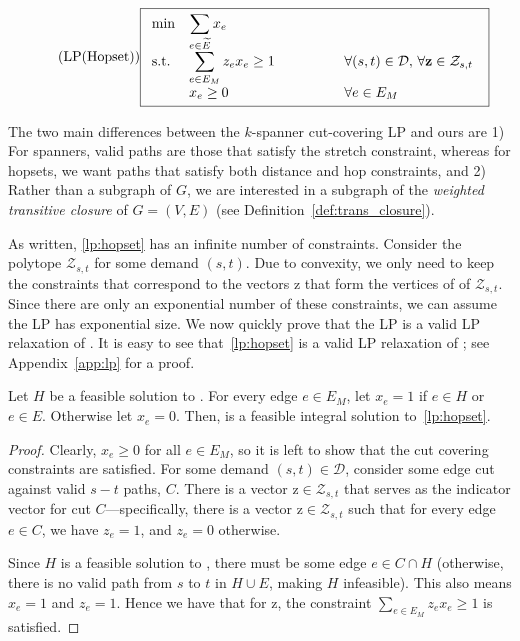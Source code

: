 \begin{equation} \label{lp:hopset} \tag{LP(Hopset)}
\fbox{$
\begin{array}{lll}
\min & \displaystyle \sum_{e \in \widetilde{E} } x_e \\
\mathrm{s.t.} & \displaystyle \sum_{e \in E_M} z_e x_e \geq 1 \qquad \qquad & \forall (s,t) \in \mathcal{D}, \, \forall \bm{\mathrm{z}} \in \mathcal{Z}_{s,t} \\
& \displaystyle x_e \geq 0 & \forall e \in E_M \\
\end{array}
$
}
\end{equation}

The two main differences between the $k$-spanner cut-covering LP and ours are 1) For spanners, valid paths are those that satisfy the stretch constraint, whereas for hopsets, we want paths that satisfy both distance and hop constraints, and 2) Rather than a subgraph of $G$, we are interested in a subgraph of the \textit{weighted transitive closure} of $G = (V,E)$ (see Definition~\ref{def:trans_closure}). 

As written, \ref{lp:hopset} has an infinite number of constraints. Consider the polytope $\mathcal{Z}_{s,t}$ for some demand $(s,t)$. Due to convexity, we only need to keep the constraints that correspond to the vectors $\bm{\mathrm{z}}$ that form the vertices of of $\mathcal{Z}_{s,t}$. Since there are only an exponential number of these constraints, we can assume the LP has exponential size. \iflong We now quickly prove that the LP is a valid LP relaxation of {\hopset}. \else It is easy to see that~\ref{lp:hopset} is a valid LP relaxation of {\hopset}; see Appendix~\ref{app:lp} for a proof.  \fi

\iflong
\begin{lemma}
    Let $H$ be a feasible solution to {\hopset}. For every edge $e \in E_M$, let $x_e = 1$ if $e \in H$ or $e \in E$. Otherwise let $x_e = 0$. Then,  is a feasible integral solution to~\ref{lp:hopset}.
\end{lemma}
\begin{proof}
    Clearly, $x_e \geq 0$ for all $e \in E_M$, so it is left to show that the cut covering constraints are satisfied. For some demand $(s,t) \in \mathcal{D}$, consider some edge cut against valid $s-t$ paths, $C$. There is a vector $\bm{\mathrm{z}} \in \mathcal{Z}_{s,t}$ that serves as the indicator vector for cut $C$---specifically, there is a vector $\bm{\mathrm{z}} \in \mathcal{Z}_{s,t}$ such that for every edge $e \in C$, we have $z_e = 1$, and $z_e = 0$ otherwise. 
    
    Since $H$ is a feasible solution to {\hopset}, there must be some edge $e \in C \cap H$ (otherwise, there is no valid path from $s$ to $t$ in $H \cup E$, making $H$ infeasible). This also means $x_e = 1$ and  $z_e = 1$. Hence we have that for $\bm{\mathrm{z}}$, the constraint $\sum_{e \in E_M} z_e x_e \geq 1$ is satisfied.
\end{proof}

